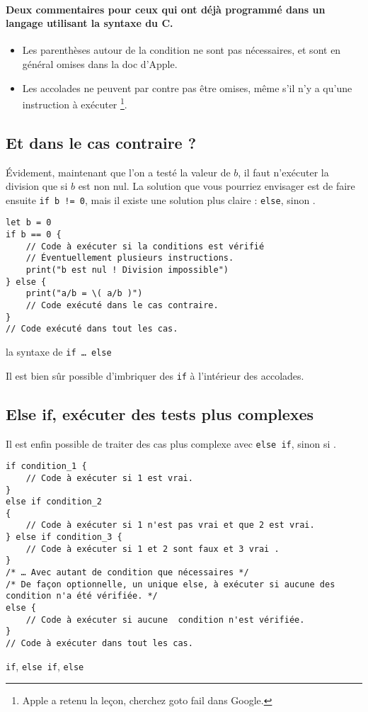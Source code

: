 \paragraph{Deux commentaires pour ceux qui ont déjà programmé
dans un langage utilisant la syntaxe du C.}
\begin{itemize}
\item Les parenthèses autour de la condition ne sont pas nécessaires,
et sont en général omises dans la doc d'Apple.
\item Les accolades ne peuvent par contre pas être omises,
même s'il n'y a qu'une instruction à exécuter
\footnote{Apple a retenu la leçon, cherchez \og goto fail \fg{} dans Google.}.
\end{itemize}
\subsection{Et dans le cas contraire ?}
Évidement, maintenant que l'on a testé la valeur de $b$, il faut n'exécuter la division que si $b$ est non nul.
La solution que vous pourriez envisager est de faire ensuite
\texttt{if b != 0},
mais il existe une solution plus claire : \texttt{else}, \og sinon \fg{}.
\begin{listing}[h]
\begin{verbatim}
let b = 0
if b == 0 {
    // Code à exécuter si la conditions est vérifié
    // Éventuellement plusieurs instructions.
    print("b est nul ! Division impossible")
} else {
    print("a/b = \( a/b )")
    // Code exécuté dans le cas contraire.
}
// Code exécuté dans tout les cas.
\end{verbatim}
\caption{la syntaxe de \texttt{if … else}}
\end{listing} %

Il est bien sûr possible d'imbriquer des \texttt{if} à l'intérieur des accolades.
\subsection{Else if, exécuter des tests plus complexes}
Il est enfin possible de traiter des cas plus complexe avec \texttt{else if}, \og sinon si \fg{}.

\begin{listing}[h]
\begin{verbatim}
if condition_1 {
    // Code à exécuter si 1 est vrai.
}
else if condition_2
{
    // Code à exécuter si 1 n'est pas vrai et que 2 est vrai.
} else if condition_3 {
    // Code à exécuter si 1 et 2 sont faux et 3 vrai .
}
/* … Avec autant de condition que nécessaires */
/* De façon optionnelle, un unique else, à exécuter si aucune des condition n'a été vérifiée. */
else {
    // Code à exécuter si aucune  condition n'est vérifiée.
}
// Code à exécuter dans tout les cas.
\end{verbatim}
\caption{\texttt{if}, \texttt{else if}, \texttt{else}}
\end{listing}

